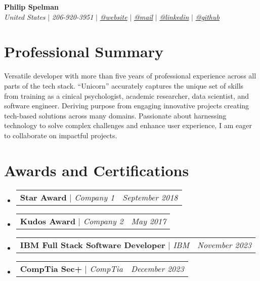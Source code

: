 \documentclass[letterpaper,10pt]{article}
\makeatletter
\newcommand{\sectionspace}{
\vspace{-20pt}
}
\newcommand{\subheadingtitlevspace}{
\vspace{-3pt}
}
\newcommand{\titleItem}[1]{
  \textbf{#1}
}
\newcommand{\resumeProjectHeading}[2]{
    \item
    \begin{tabular*}{0.97\textwidth}{l@{\extracolsep{\fill}}r}
      #1 & \textit{ #2} \\
    \end{tabular*}\vspace{-9pt}
}
\newcommand{\resumeSubHeadingListStart}{\subheadingtitlevspace\begin{itemize}[leftmargin=0.15in, label={}]}
\newcommand{\resumeSubHeadingListEnd}{\end{itemize}}
\makeatother
\begin{document}

\begin{flushleft}
    \textbf{\large Philip Spelman} \\
    \textit{United States} $|$
    \textit{206-920-3951} $|$
    \href{http://www.philspelman.com}{{\textit{@website}}} $|$
    \href{mailto:phil.spelman@gmail.com}{{\textit{@mail}}} $|$
    \href{https://www.linkedin.com/in/philspelman/}{{\textit{@linkedin}}} $|$
    \href{https://github.com/pspelman}{{\textit{@github}}}
    \vspace{-8pt}
\end{flushleft}


\section{Professional Summary}
\vspace{-3pt}
\begin{itemize}[leftmargin=0.15in, label={}]
    {\item{
     {Versatile developer with more than five years of professional experience across all parts of the tech stack. “Unicorn” accurately captures the unique set of skills from training as a cinical psychologist, academic researcher, data scientist, and software engineer. Deriving purpose from engaging innovative projects creating tech-based solutions across many domains. Passionate about harnessing technology to solve complex challenges and enhance user experience, I am eager to collaborate on impactful projects.} \\
    }}
 \end{itemize}
 \sectionspace



\section{Awards and Certifications}
    \resumeSubHeadingListStart
      \resumeProjectHeading
          {\titleItem{Star Award} \emph{ $|$ Company 1}}{September 2018}
      \resumeProjectHeading
          {\titleItem{Kudos Award} \emph{ $|$ Company 2}}{May 2017}
      \resumeProjectHeading
          {\titleItem{IBM Full Stack Software Developer} \emph{$|$ IBM}}{November 2023}
          \resumeProjectHeading
          {\titleItem{CompTia Sec+} \emph{$|$ CompTia}}{December 2023}
    \resumeSubHeadingListEnd
\end{document}

